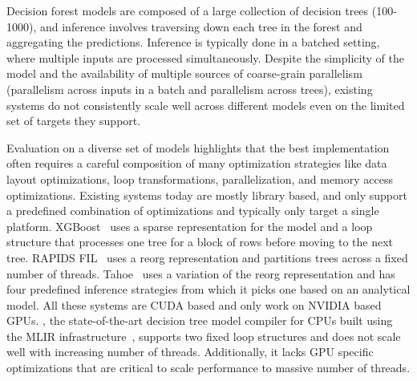 Decision forest models are composed of a large collection of decision trees (100-1000), and inference involves 
traversing down each tree in the forest and aggregating the predictions. Inference is typically done in a batched
setting, where multiple inputs are processed simultaneously.
Despite the simplicity of the model and the availability of multiple sources of coarse-grain parallelism (parallelism 
across inputs in a batch and parallelism across trees), existing systems do not consistently scale well across different
models even on the limited set of targets they support. 

Evaluation on a diverse set of models highlights that the best implementation often requires a careful composition 
of many optimization strategies like data layout optimizations, 
loop transformations, parallelization, and memory access optimizations. 
Existing systems today are mostly library based, and only support a predefined combination of optimizations
and typically only target a single platform. 
XGBoost~\cite{XGBoost} uses a sparse representation for the model and a loop structure that processes one tree for a block of rows before moving to 
the next tree. RAPIDS FIL~\cite{FIL} uses a reorg representation and partitions trees across a fixed number of threads. 
Tahoe~\cite{Tahoe} uses a
variation of the reorg representation and has four predefined inference strategies from which it picks one based on an analytical model.
All these systems are CUDA based and only work on NVIDIA based GPUs.
\TreebeardOLD{}, the state-of-the-art decision tree model compiler for CPUs 
built using the MLIR infrastructure~\cite{MLIR}, supports two fixed loop structures 
and does not scale well with increasing number of threads. Additionally, it lacks 
GPU specific optimizations that are critical to scale performance to massive number of threads.

